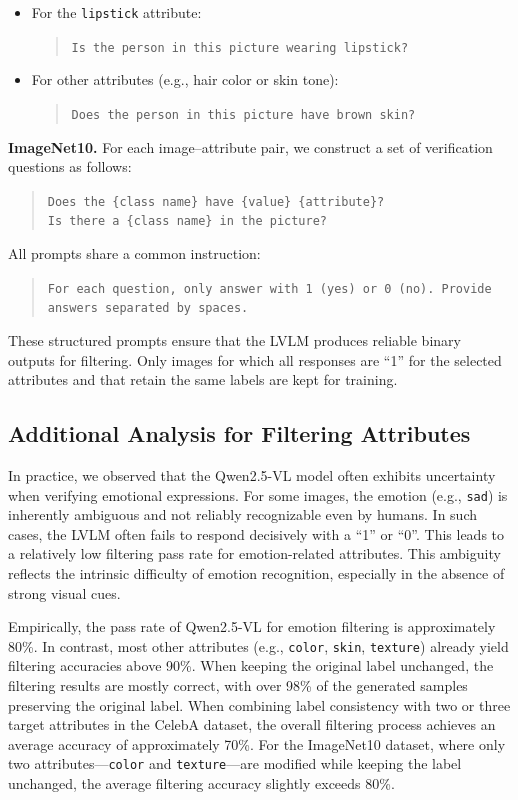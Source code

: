 \documentclass[10pt]{article} %
\newcommand{\qwen}{Qwen2.5-VL\xspace}
\begin{document}
\begin{itemize}
  \item For the \texttt{lipstick} attribute:
  \begin{quote}
  \texttt{Is the person in this picture wearing lipstick?}
  \end{quote}

  \item For other attributes (e.g., hair color or skin tone):
  \begin{quote}
  \texttt{Does the person in this picture have brown skin?}
  \end{quote}
\end{itemize}

\textbf{ImageNet10.} For each image–attribute pair, we construct a set of verification questions as follows:

\begin{quote}
\texttt{Does the \{class name\} have \{value\} \{attribute\}?} \\
\texttt{Is there a \{class name\} in the picture?}
\end{quote}

All prompts share a common instruction:
\begin{quote}
\texttt{For each question, only answer with 1 (yes) or 0 (no). Provide answers separated by spaces.}
\end{quote}
These structured prompts ensure that the LVLM produces reliable binary outputs for filtering. Only images for which all responses are ``1'' for the selected attributes and that retain the same labels are kept for training.


\subsection{Additional Analysis for Filtering Attributes}
\label{qwen_vs_llava}
In practice, we observed that the \qwen model often exhibits uncertainty when verifying emotional expressions. For some images, the emotion (e.g., \texttt{sad}) is inherently ambiguous and not reliably recognizable even by humans. In such cases, the LVLM often fails to respond decisively with a ``1'' or ``0''. This leads to a relatively low filtering pass rate for emotion-related attributes. This ambiguity reflects the intrinsic difficulty of emotion recognition, especially in the absence of strong visual cues.

Empirically, the pass rate of \qwen for emotion filtering is approximately 80\%. In contrast, most other attributes (e.g., \texttt{color}, \texttt{skin}, \texttt{texture}) already yield filtering accuracies above 90\%. When keeping the original label unchanged, the filtering results are mostly correct, with over 98\% of the generated samples preserving the original label. When combining label consistency with two or three target attributes in the CelebA dataset, the overall filtering process achieves an average accuracy of approximately 70\%. For the ImageNet10 dataset, where only two attributes—\texttt{color} and \texttt{texture}—are modified while keeping the label unchanged, the average filtering accuracy slightly exceeds 80\%.
\end{document}
